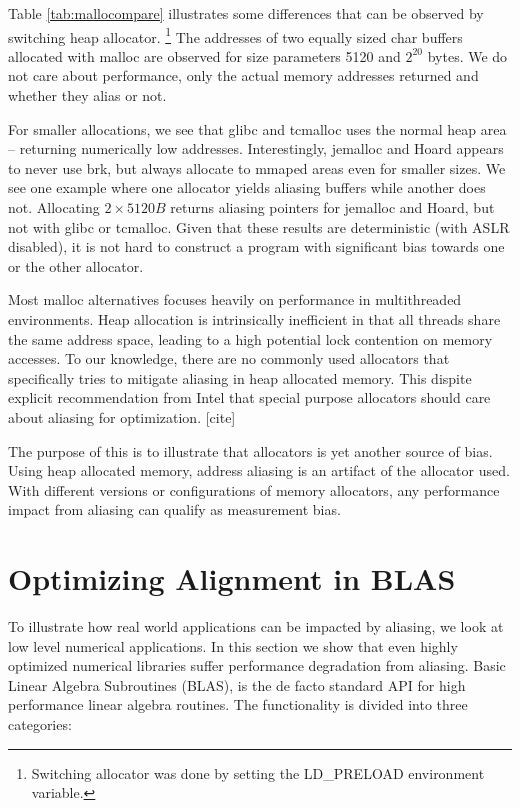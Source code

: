 \documentclass[a4paper,10pt,twocolumn,twoside]{article}
\begin{document}
Table \ref{tab:mallocompare} illustrates some differences that can be observed by switching heap allocator. \footnote{Switching allocator was done by setting the LD\_PRELOAD environment variable.}
The addresses of two equally sized char buffers allocated with malloc are observed for size parameters 5120 and $2^{20}$ bytes. 
We do not care about performance, only the actual memory addresses returned and whether they alias or not.

For smaller allocations, we see that glibc and tcmalloc uses the normal heap area -- returning numerically low addresses.
Interestingly, jemalloc and Hoard appears to never use brk, but always allocate to mmaped areas even for smaller sizes.
We see one example where one allocator yields aliasing buffers while another does not. 
Allocating $2 \times 5120 B$ returns aliasing pointers for jemalloc and Hoard, but not with glibc or tcmalloc.
Given that these results are deterministic (with ASLR disabled), it is not hard to construct a program with significant bias towards one or the other allocator.

Most malloc alternatives focuses heavily on performance in multithreaded environments.
Heap allocation is intrinsically inefficient in that all threads share the same address space, leading to a high potential lock contention on memory accesses.
To our knowledge, there are no commonly used allocators that specifically tries to mitigate aliasing in heap allocated memory.
This dispite explicit recommendation from Intel that special purpose allocators should care about aliasing for optimization. [cite]

The purpose of this is to illustrate that allocators is yet another source of bias.
Using heap allocated memory, address aliasing is an artifact of the allocator used.
With different versions or configurations of memory allocators, any performance impact from aliasing can qualify as measurement bias.


\iffalse

\section{Optimizing Alignment in BLAS}

To illustrate how real world applications can be impacted by aliasing, we look at low level numerical applications.
In this section we show that even highly optimized numerical libraries suffer performance degradation from aliasing.
Basic Linear Algebra Subroutines (BLAS), is the de facto standard API for high performance linear algebra routines.
The functionality is divided into three categories: 
\end{document}
